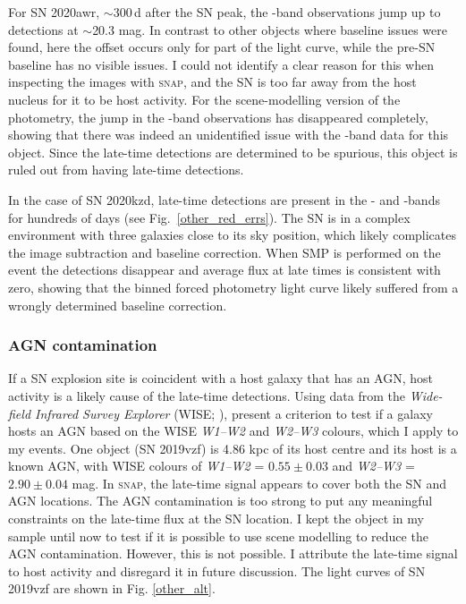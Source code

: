 \documentclass[a4paper,oneside,12pt, class=Latex/Classes/PhDthesisPSnPDF, crop=false]{standalone}
\begin{document}
For SN 2020awr, $\sim$300\,d after the SN peak, the \ztfi-band observations jump up to detections at $\sim$20.3 mag. In contrast to other objects where baseline issues were found, here the offset occurs only for part of the light curve, while the pre-SN baseline has no visible issues. I could not identify a clear reason for this when inspecting the images with \textsc{snap}, and the SN is too far away from the host nucleus for it to be host activity. For the scene-modelling version of the photometry, the jump in the \ztfi-band observations has disappeared completely, showing that there was indeed an unidentified issue with the \ztfi-band data for this object. Since the late-time detections are determined to be spurious, this object is ruled out from having late-time detections.

In the case of SN 2020kzd, late-time detections are present in the \ztfg- and \ztfr-bands for hundreds of days (see Fig.~\ref{other_red_errs}). The SN is in a complex environment with three galaxies close to its sky position, which likely complicates the image subtraction and baseline correction. When SMP is performed on the event the detections disappear and average flux at late times is consistent with zero, showing that the binned forced photometry light curve likely suffered from a wrongly determined baseline correction.

\subsubsection{AGN contamination}
\label{sec:agn_cont}
If a SN explosion site is coincident with a host galaxy that has an AGN, host activity is a likely cause of the late-time detections. Using data from the \textit{Wide-field Infrared Survey Explorer} (WISE; \citealt{WISE}), \citet{WISE_crit} present a criterion to test if a galaxy hosts an AGN based on the WISE \textit{W1--W2} and \textit{W2--W3} colours, which I apply to my events. One object (SN 2019vzf) is 4.86 kpc of its host centre and its host is a known AGN, with WISE colours of \textit{W1--W2} = $0.55\pm0.03$ and \textit{W2--W3} = $2.90\pm0.04$ mag. In \textsc{snap}, the late-time signal appears to cover both the SN and AGN locations. The AGN contamination is too strong to put any meaningful constraints on the late-time flux at the SN location. I kept the object in my sample until now to test if it is possible to use scene modelling to reduce the AGN contamination. However, this is not possible. I attribute the late-time signal to host activity and disregard it in future discussion. The light curves of SN 2019vzf are shown in Fig. \ref{other_alt}.
\end{document}
